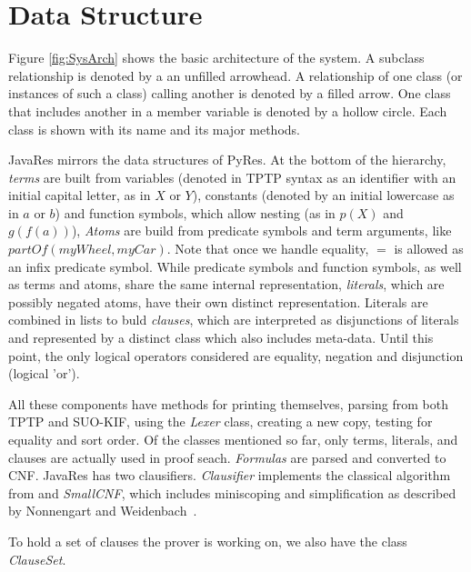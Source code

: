 \documentclass{llncs}
\begin{document}
\section{Data Structure}

Figure \ref{fig:SysArch} shows the basic architecture of the system. A
subclass relationship is denoted by a an unfilled arrowhead.  A relationship
of one class (or instances of such a class) calling another is denoted
by a filled arrow.  One class that includes another in a member
variable is denoted by a hollow circle.  Each class is shown with its
name and its major methods.

JavaRes mirrors the data structures of PyRes.  At the bottom of the
hierarchy, \emph{terms} are built from variables (denoted in TPTP
syntax as an identifier with an initial capital letter, as in $X$ or
$Y$), constants (denoted by an initial lowercase as in $a$ or $b$) and
function symbols, which allow nesting (as in $p(X)$ and $g(f(a))$),
\emph{Atoms} are build from predicate symbols and term arguments, like
$partOf(myWheel,myCar)$.  Note that once we handle equality, $=$ is
allowed as an infix predicate symbol. While predicate symbols and
function symbols, as well as terms and atoms, share the same internal
representation, \emph{literals}, which are possibly negated atoms,
have their own distinct representation. Literals are combined in lists
to buld \emph{clauses}, which are interpreted as disjunctions of
literals and represented by a distinct class which also includes
meta-data.  Until this point, the only logical operators considered
are equality, negation and disjunction (logical 'or').

All these components have methods for printing themselves, parsing
from both TPTP and SUO-KIF, using the \emph{Lexer} class, creating a new
copy, testing for equality and sort order. Of the classes mentioned so
far, only terms, literals, and clauses are actually used in proof
seach.  \emph{Formulas} are parsed and converted to CNF.  JavaRes has
two clausifiers. \emph{Clausifier} implements the classical algorithm
from \cite{RN:AI-95} and \emph{SmallCNF}, which includes miniscoping
and simplification as described by Nonnengart and
Weidenbach~\cite{NW:SmallCNF-2001}.

To hold a set of clauses the prover is working on, we also have the
class \emph{ClauseSet}.
\end{document}
